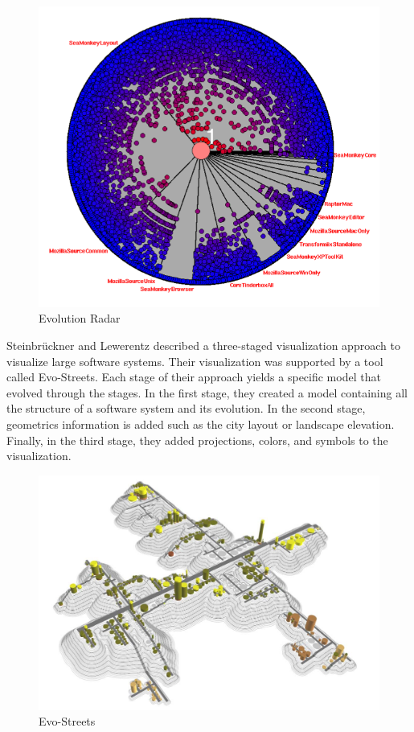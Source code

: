 \begin{figure}[H]
  \includegraphics[width=\linewidth]{DAmbros2006a_EvoRadar.png}
  \caption{Evolution Radar}
  \label{fig:Evoradar}
\endminipage\hfill
  \end{figure}
  
Steinbrückner and Lewerentz \cite{Steinbrueckner2010} described a three-staged visualization approach to visualize large software systems. 
Their visualization was supported by a tool called Evo-Streets. 
Each stage of their approach yields a specific model that evolved through the stages. In the first stage, they created a model containing all the structure of a software system and its evolution. In the second stage, geometrics information is added such as the city layout or landscape elevation. Finally, in the third stage, they added projections, colors, and symbols to the visualization. 

\begin{figure}[ht]
\centering
  \includegraphics[width=0.9\linewidth]{Steinbrueckner2010.png} 
  \caption{Evo-Streets}
\end{figure}
 
